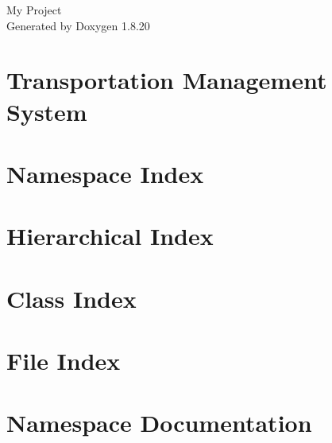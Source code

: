 \let\mypdfximage\pdfximage\def\pdfximage{\immediate\mypdfximage}\documentclass[twoside]{book}
\newcommand{\+}{\discretionary{\mbox{\scriptsize$\hookleftarrow$}}{}{}}
\newcommand{\clearemptydoublepage}{%
  \newpage{\pagestyle{empty}\cleardoublepage}%
}
\begin{document}
\hypersetup{pageanchor=false,
             bookmarksnumbered=true,
             pdfencoding=unicode
            }
\begin{titlepage}
\vspace*{7cm}
\begin{center}%
{\Large My Project }\\
\vspace*{1cm}
{\large Generated by Doxygen 1.8.20}\\
\end{center}
\end{titlepage}
\clearemptydoublepage
{}
\tableofcontents
\clearemptydoublepage
{}
\hypersetup{pageanchor=true}

\chapter{Transportation Management System}
\label{index}\hypertarget{index}{}
\chapter{Namespace Index}

\chapter{Hierarchical Index}

\chapter{Class Index}

\chapter{File Index}

\chapter{Namespace Documentation}





\end{document}
